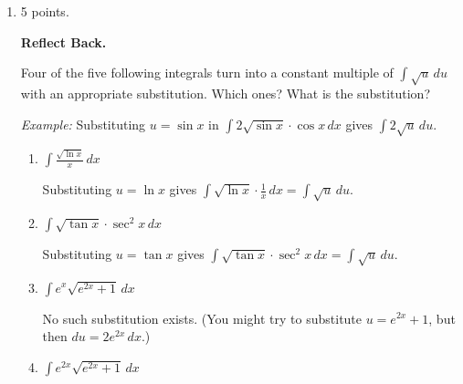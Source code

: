 \documentclass{article}
\begin{document}
\begin{enumerate}
\item 

\begin{grading}
5 points.
\end{grading}

 \textbf{Reflect Back.} 

  Four of the five following integrals turn into a constant multiple of $\displaystyle \int
  \sqrt{u}\,du$ with an appropriate substitution. Which ones? What is the substitution?
  \begin{center}
    \emph{Example:} Substituting $u = \sin x$ in $\displaystyle \int 2
    \sqrt{\sin x} \cdot \cos x\,dx$ gives $\displaystyle \int 2
    \sqrt{u}\,du$.
  \end{center}

  \probonly{}
    \begin{enumerate}
    \item
      \begin{problem}
        $\displaystyle \int \frac{\sqrt{\ln x}}{x}\,dx$      
      \end{problem}

      \begin{solution}
        Substituting $u=\ln x$ gives $\displaystyle\int \sqrt{\ln x} \cdot
        \frac{1}{x}\,dx = \int \sqrt{u}\,du$.
      \end{solution}

    \item 
      \begin{problem}
        $\displaystyle \int \sqrt{\tan x} \cdot \sec^2 x\,dx$
      \end{problem}

      \begin{solution}
        Substituting $u = \tan x$ gives $\displaystyle \int \sqrt{\tan x}
        \cdot \sec^2 x\,dx = \int \sqrt{u}\,du$.
      \end{solution}

    \item
      \begin{problem}
        $\displaystyle \int e^x \sqrt{e^{2x} + 1}\,dx$
      \end{problem}

      \begin{solution}
        No such substitution exists.  (You might try to substitute $u =
        e^{2x} + 1$, but then $du = 2 e^{2x}\,dx$.)
      \end{solution}

    \item
      \begin{problem}
        $\displaystyle \int e^{2x} \sqrt{e^{2x} + 1}\,dx$
      \end{problem}


\end{enumerate}
\end{enumerate}
\end{document}
